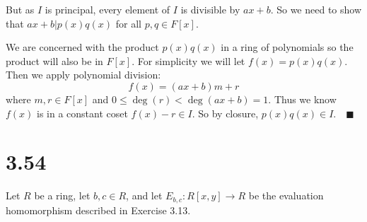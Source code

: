 \documentclass[12pt]{article}
\newcommand{\qed}{\quad \blacksquare}
\begin{document}
\begin{enumerate}[label=(\alph*)]
                But as $I$ is principal, every element of $I$ is divisible by $ax + b$. So we need to show that $ax + b \Big\vert p(x)q(x)$ for all $p, q \in F[x]$. 
                
                We are concerned with the product $p(x)q(x)$ in a ring of polynomials so the product will also be in $F[x]$. For simplicity we will let $f(x) = p(x)q(x)$. Then we apply polynomial division:
                \[f(x) = (ax + b)m + r\]
                where $m, r\in F[x]$ and $0 \leq \deg(r) < \deg(ax + b) = 1$. Thus we know $f(x)$ is in a constant coset $f(x) - r \in I$. So by closure, $p(x)q(x) \in I. \qed$
            \color{black}
    \end{enumerate}
\pagebreak

\section*{3.54}
    Let $R$ be a ring, let $b, c \in R$, and let $E_{b,c} : R[x, y] \to R$ be the evaluation homomorphism described in Exercise 3.13.
\end{document}
